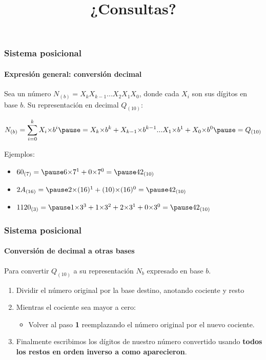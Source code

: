 \documentclass[11pt,a4paper,spanish]{beamer}
\begin{document}
\begin{frame}

\frametitle{Sistema posicional}
\framesubtitle{Expresión general: conversión decimal}

    Sea un número $N_{(b)} = X_{k}X_{k-1}...X_{2}X_{1}X_{0}$, donde cada $X_{i}$ son sus
    dígitos en base $b$. Su representación en decimal $Q_{(10)}$:

\begin{equation*}
    N_{(b)} = \displaystyle\sum_{i=0}^{k} X_{i}{\times}b^{i}
    \pause
    =
    X_{k}{\times}b^{k}+X_{k-1}{\times}b^{k-1}...
        X_{1}{\times}b^{1}+X_{0}{\times}b^{0}
    \pause
    = Q_{(10)}
\end{equation*}
\pause

Ejemplos:
\pause
\begin{itemize}
    \item
        $60_{(7)} = \pause
        6{\times}7^1+0{\times}7^0 = \pause
        42_{(10)}$\pause
    \item $2A_{(16)} = \pause
        2{\times}(16)^1+(10){\times}(16)^0 = \pause
        42_{(10)}$\pause
    \item $1120_{(3)} = \pause
        1{\times}3^3+1{\times}3^2+2{\times}3^1+0{\times}3^0 = \pause
        42_{(10)}$
\end{itemize}

\end{frame}

\begin{frame}

\title{¿Consultas?}
\maketitle

\end{frame}

\begin{frame}

\frametitle{Sistema posicional}
\framesubtitle{Conversión de decimal a otras bases}

    Para convertir $Q_{(10)}$ a su representación $N_{b}$ expresado en base
    $b$.
    \begin{enumerate}
        \item Dividir el número original por la base destino, anotando
            cociente y resto
    \item Mientras el cociente sea mayor a cero:
        \begin{itemize}
            \item Volver al paso \textbf{1} reemplazando el número original
                por el nuevo cociente.
        \end{itemize}
    \item Finalmente escribimos los dígitos de nuestro número convertido
        usando \textbf{todos los restos en orden inverso a como aparecieron}.
    \end{enumerate}

\end{frame}
\end{document}
